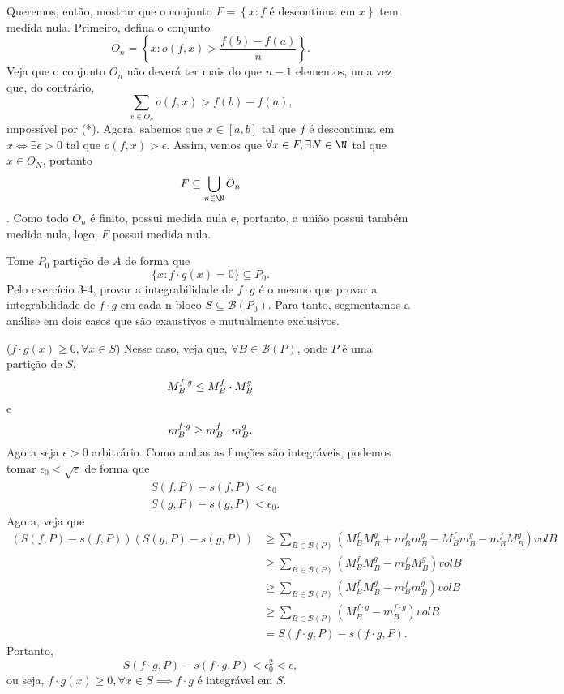 \documentclass[a4paper]{report}
\begin{document}
Queremos, então, mostrar que o conjunto $F=\left\{ x: f\text{ é descontínua em }x \right\}$ tem medida nula. Primeiro, defina o conjunto \[
O_n = \left\{ x : o\left( f,x \right) > \frac{f\left( b \right) -f\left( a \right) }{n} \right\} 
.\] Veja que o conjunto $O_n$ não deverá ter mais do que $n-1$ elementos, uma vez que, do contrário, \[
\sum_{x\in O_n} o\left( f,x \right) > f\left( b \right) -f\left( a \right) 
,\] impossível por (*). Agora, sabemos que $x\in \left[ a,b \right] $ tal que $f$ é descontinua em $x \iff \exists \epsilon>0$ tal que $o\left( f,x \right) > \epsilon$. Assim, vemos que $\forall x\in F, \exists N\in \N$ tal que $x\in O_N$, portanto \[
F \subseteq \bigcup_{n\in \N} O_n
\] . Como todo $O_n$ é finito, possui medida nula e, portanto, a união possui também medida nula, logo, $F$ possui medida nula.


Tome $P_0$ partição de $A$ de forma que \[
\{x:f\cdot g\left( x \right) = 0\} \subseteq P_0
.\] Pelo exercício 3-4, provar a integrabilidade de $f\cdot g$ é o mesmo que provar a integrabilidade de $f\cdot g$ em cada n-bloco $S\subseteq \mathcal{B}\left( P_0 \right) $. Para tanto, segmentamos a análise em dois casos que são exaustivos e mutualmente exclusivos.

($f\cdot g\left( x \right) \ge 0, \forall x\in S$)
Nesse caso, veja que, $\forall B\in \mathcal{B}\left( P \right) $, onde $P$ é uma partição de $S$, \[
    M_B^{f\cdot g} \le  M_B^{f} \cdot M_B^{g} \\
\] e \[
    m_B^{f\cdot g} \ge  m_B^{f} \cdot m_B^{g} \\
.\] Agora seja $\epsilon>0$ arbitrário. Como ambas as funções são integráveis, podemos tomar $\epsilon_0 < \sqrt{\epsilon} $ de forma que
\begin{align*}
    & S\left( f,P \right) - s\left( f,P \right) < \epsilon_0 \\
    & S\left( g,P \right) - s\left( g,P \right) < \epsilon_0
.\end{align*}
Agora, veja que
\begin{align*}
    \left( S\left( f,P \right) - s\left( f,P \right) \right) \left( S\left( g,P \right) - s\left( g,P \right) \right) &\ge \sum_{B\in \mathcal{B}\left( P \right) } \left( M_B^{f}M_B^{g} + m_B^{f}m_B^{g} - M_B^{f}m_B^{g} - m_B^{f}M_B^{g} \right) vol B \tag{*} \\
															 &\ge \sum_{B\in \mathcal{B}\left( P \right) } \left( M_B^{f}M_B^{g} - m_B^{f}M_B^{g} \right) vol B \\
															 &\ge \sum_{B\in \mathcal{B}\left( P \right) } \left( M_B^{f}M_B^{g} - m_B^{f}m_B^{g} \right) vol B \\
															 &\ge  \sum_{B\in \mathcal{B}\left( P \right) } \left( M_B^{f\cdot g} - m_B^{f\cdot g} \right) vol B \\
															 &= S\left( f\cdot g, P \right) - s\left( f\cdot g, P \right) 
.\end{align*}
Portanto, \[
S\left( f\cdot g, P \right) - s\left( f\cdot g, P \right) < \epsilon_0^2 < \epsilon
,\] ou seja, $f\cdot g\left( x \right) \ge 0, \forall x\in S \implies f\cdot g$ é integrável em $S$.
\end{document}
